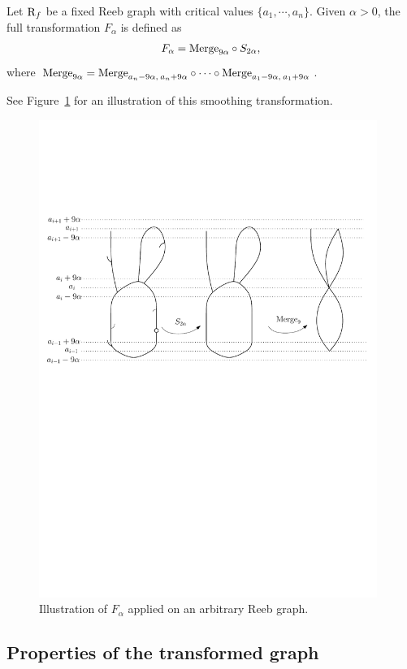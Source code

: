 %
\begin{defin}\label{def:simpl}
Let $\mathrm{R}_f$ be a fixed Reeb graph with critical values $\{a_1,\cdots,a_n\}$. 
Given $\alpha > 0$, the full transformation $F_\alpha$ is defined as
$$F_{\alpha}=\mathrm{Merge}_{9\alpha}\circ S_{2\alpha},$$
where $\mathrm{Merge}_{9\alpha}=\mathrm{Merge}_{a_n-9\alpha,\:a_n+9\alpha}\circ \cdots \circ \mathrm{Merge}_{a_1-9\alpha,\:a_1+9\alpha}$.
\end{defin}
See Figure~\ref{fig:recap3} for an illustration of this smoothing transformation.

\begin{figure}[htb]
\centering
\includegraphics[width=11cm]{figures/FullTransform}
\caption[Simplification operator]{Illustration of $F_{\alpha}$ applied on an arbitrary Reeb graph.}
\label{fig:recap3}
\end{figure} 


\subsection*{Properties of the transformed graph}
\label{sec:Proof}

